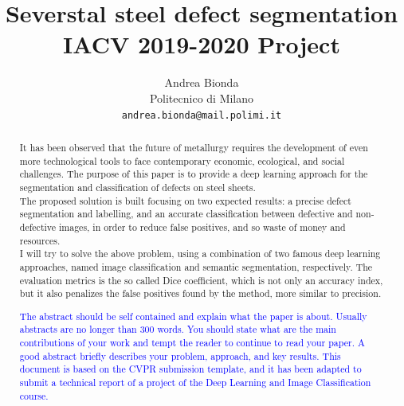 \documentclass[10pt,twocolumn,letterpaper]{article}
\begin{document}
\title{Severstal steel defect segmentation \\ IACV 2019-2020 Project} 

\author{Andrea Bionda\\
Politecnico di Milano\\
{\tt\small andrea.bionda@mail.polimi.it}}

\maketitle

\begin{abstract}
   It has been observed that the future of metallurgy requires the development of even more technological tools to face contemporary economic, ecological, and social challenges.
   The purpose of this paper is to provide a deep learning approach for the segmentation and classification of defects on steel sheets.\\
   The proposed solution is built focusing on two expected results: a precise defect segmentation and labelling, and an accurate classification between defective and non-defective images, in order to reduce false positives, and so waste of money and resources.\\
   I will try to solve the above problem, using a combination of two famous deep learning approaches, named image classification and semantic segmentation, respectively.
   The evaluation metrics is the so called Dice coefficient, which is not only an accuracy index, but it also penalizes the false positives found by the method, more similar to precision.

   \textcolor{blue}{
   The abstract should be self contained and explain what the paper is about. Usually abstracts are no longer than 300 words. You should state what are the main contributions of your work and tempt the reader to continue to read your paper. A good abstract briefly describes your problem, approach, and key results. This document is based on the CVPR submission template, and it has been adapted to submit a technical report of a project of the Deep Learning and Image Classification course.}
\end{abstract}

\graphicspath{ {./Resources/} }
\end{document}
